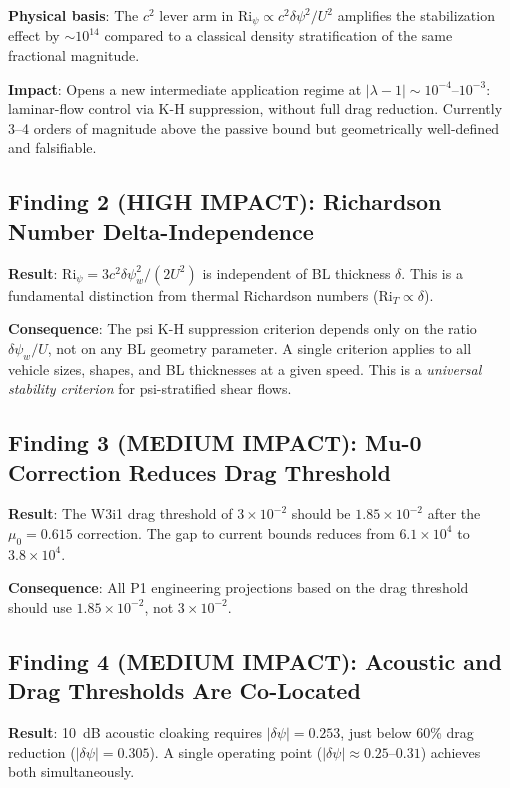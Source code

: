 \documentclass[11pt,twocolumn]{article}
\newcommand{\dpsi}{\delta\psi}
\newcommand{\lam}{\lambda}
\newcommand{\Ri}{\mathrm{Ri}}
\begin{document}
\textbf{Physical basis}: The $c^2$ lever arm in $\Ri_\psi \propto c^2\dpsi^2/U^2$
amplifies the stabilization effect by $\sim 10^{14}$ compared to a classical
density stratification of the same fractional magnitude.

\textbf{Impact}: Opens a new intermediate application regime at $|\lam-1| \sim
10^{-4}$--$10^{-3}$: laminar-flow control via K-H suppression, without full
drag reduction. Currently 3--4 orders of magnitude above the passive bound
but geometrically well-defined and falsifiable.

\subsection{Finding 2 (HIGH IMPACT): Richardson Number Delta-Independence}

\textbf{Result}: $\Ri_\psi = 3c^2\dpsi_w^2/(2U^2)$ is independent of BL
thickness $\delta$. This is a fundamental distinction from thermal
Richardson numbers ($\Ri_T \propto \delta$).

\textbf{Consequence}: The psi K-H suppression criterion depends only on the
ratio $\dpsi_w/U$, not on any BL geometry parameter. A single criterion
applies to all vehicle sizes, shapes, and BL thicknesses at a given speed.
This is a \emph{universal stability criterion} for psi-stratified shear flows.

\subsection{Finding 3 (MEDIUM IMPACT): Mu-0 Correction Reduces Drag Threshold}

\textbf{Result}: The W3i1 drag threshold of $3\times10^{-2}$ should be
$1.85\times10^{-2}$ after the $\mu_0 = 0.615$ correction. The gap to current
bounds reduces from $6.1\times10^4$ to $3.8\times10^4$.

\textbf{Consequence}: All P1 engineering projections based on the drag
threshold should use $1.85\times10^{-2}$, not $3\times10^{-2}$.

\subsection{Finding 4 (MEDIUM IMPACT): Acoustic and Drag Thresholds Are
Co-Located}

\textbf{Result}: 10~dB acoustic cloaking requires $|\dpsi| = 0.253$,
just below 60\% drag reduction ($|\dpsi| = 0.305$). A single operating
point ($|\dpsi| \approx 0.25$--$0.31$) achieves both simultaneously.
\end{document}
